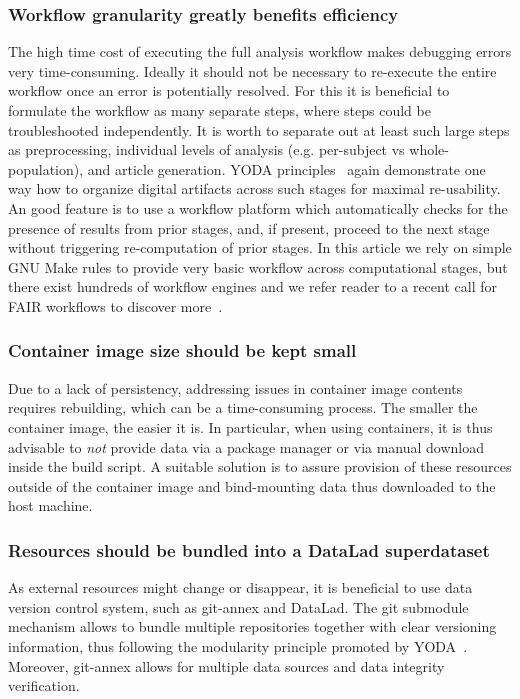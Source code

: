 \subsubsection{Workflow granularity greatly benefits efficiency}
The high time cost of executing the full analysis workflow makes debugging errors very time-consuming.
Ideally it should not be necessary to re-execute the entire workflow once an error is potentially resolved.
For this it is beneficial to formulate the workflow as many separate steps, where steps could be troubleshooted independently.
It is worth to separate out at least such large steps as preprocessing, individual levels of analysis (e.g. per-subject vs whole-population), and article generation.
YODA principles~\cite{yoda} again demonstrate one way how to organize digital artifacts across such stages for maximal re-usability.
An good feature is to use a workflow platform which automatically checks for the presence of results from prior stages, and, if present, proceed to the next stage without triggering re-computation of prior stages.
In this article we rely on simple GNU Make rules to provide very basic workflow across computational stages, but there exist hundreds of workflow engines and we refer reader to a recent call for FAIR workflows to discover more~\cite{fair-workflows}.

\subsubsection{Container image size should be kept small}
Due to a lack of persistency, addressing issues in container image contents requires rebuilding, which can be a time-consuming process.
The smaller the container image, the easier it is.
In particular, when using containers, it is thus advisable to \textit{not} provide data via a package manager or via manual download inside the build script.
A suitable solution is to assure provision of these resources outside of the container image and bind-mounting data thus downloaded to the host machine.

\subsubsection{Resources should be bundled into a DataLad superdataset}
As external resources might change or disappear, it is beneficial to use data version control system, such as git-annex and DataLad.
The git submodule mechanism allows to bundle multiple repositories together with clear versioning information, thus following the modularity principle promoted by YODA~\cite{yoda}.
Moreover, git-annex allows for multiple data sources and data integrity verification.

